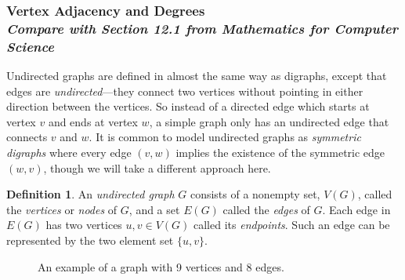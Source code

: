 \documentclass[11pt,oneside]{book}
\theoremstyle{definition}
\newtheorem{defn}[thm]{Definition}
\begin{document}
\subsubsection[Vertex Adjacency and Degrees]{Vertex Adjacency and Degrees\\[0.5ex]
\normalsize\normalfont\textit{
    Compare with Section 12.1 from \emph{Mathematics for Computer Science}
}}
Undirected graphs are defined in almost the same way as digraphs, except that edges are \emph{undirected}---they connect two vertices without pointing in either direction between the vertices.
So instead of a directed edge which starts at vertex $v$ and ends at vertex $w$, a simple graph only has an undirected edge that connects $v$ and $w$.
It is common to model undirected graphs as \emph{symmetric digraphs} where every edge $(v, w)$ implies the existence of the symmetric edge $(w, v)$, though we will take a different approach here.

\begin{defn}
  An \emph{undirected graph} $G$ consists of a nonempty set, $V(G)$, called the \emph{vertices} or \emph{nodes} of $G$, and a set $E(G)$ called the \emph{edges} of $G$.
  Each edge in $E(G)$ has two vertices $u, v \in V(G)$ called its \emph{endpoints}.
  Such an edge can be represented by the two element set $\{ u, v \}$.
\end{defn}

\begin{figure}[H]
  \centering
  \caption{An example of a graph with 9 vertices and 8 edges.}
  \label{fig:9e8eGraph}
\end{figure}
\end{document}
